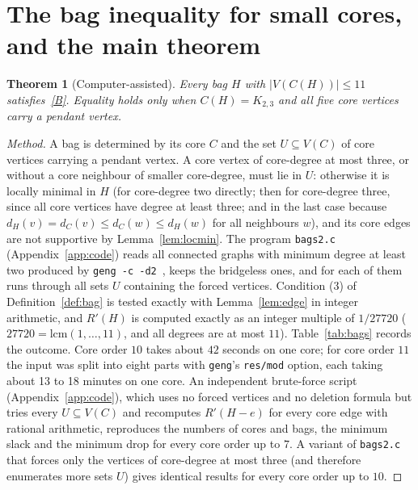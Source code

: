 \documentclass[11pt]{amsart}
\newtheorem{theorem}{Theorem}[section]
\theoremstyle{definition}
\newcommand{\Rp}{R'}
\newcommand{\kmax}{11}
\begin{document}
\section{The bag inequality for small cores, and the main theorem}\label{sec:bags}

\begin{theorem}[Computer-assisted]\label{thm:bagcomp}
Every bag $H$ with $|V(C(H))|\le\kmax$ satisfies~\eqref{B}. Equality holds only when $C(H)=K_{2,3}$ and all five core
vertices carry a pendant vertex.
\end{theorem}

\begin{proof}[Method]
A bag is determined by its core $C$ and the set $U\subseteq V(C)$ of core vertices carrying a pendant vertex. A core
vertex of core-degree at most three, or without a core neighbour of smaller core-degree, must lie in $U$: otherwise it is
locally minimal in $H$ (for core-degree two directly; then for core-degree three, since all core vertices have degree at
least three; and in the last case because $d_H(v)=d_C(v)\le d_C(w)\le d_H(w)$ for all neighbours $w$), and its core
edges are not supportive by Lemma~\ref{lem:locmin}. The program \texttt{bags2.c} (Appendix~\ref{app:code}) reads all
connected graphs with minimum degree at least two produced by \texttt{geng -c -d2}~\cite{nauty}, keeps the bridgeless
ones, and for each of them runs through all sets $U$ containing the forced vertices. Condition (3) of
Definition~\ref{def:bag} is tested exactly with Lemma~\ref{lem:edge} in integer arithmetic, and $\Rp(H)$ is computed exactly
as an integer multiple of $1/27720$ ($27720=\mathrm{lcm}(1,\dots,11)$, and all degrees are at most $11$).
Table~\ref{tab:bags} records the outcome. Core order $10$ takes about $42$ seconds on one core; for core order $11$ the
input was split into eight parts with \texttt{geng}'s \texttt{res/mod} option, each taking about 13 to 18 minutes on one
core. An independent brute-force script (Appendix~\ref{app:code}), which uses no forced
vertices and no deletion formula but tries every $U\subseteq V(C)$ and recomputes $\Rp(H-e)$ for every core edge with
rational arithmetic, reproduces the numbers of cores and bags, the minimum slack and the minimum drop for every core order
up to $7$. A variant of \texttt{bags2.c} that forces only the vertices of core-degree at most three (and therefore
enumerates more sets $U$) gives identical results for every core order up to $10$.
\end{proof}
\end{document}
